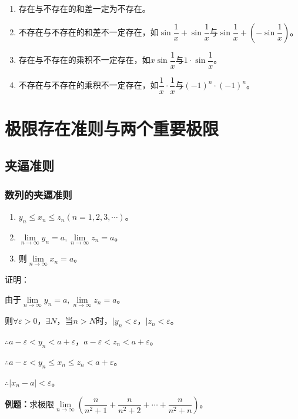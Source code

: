 \documentclass[UTF8, 12pt]{ctexart}
\begin{document}
    \begin{enumerate}
        \item 存在与不存在的和差一定为不存在。
        \item 不存在与不存在的和差不一定存在，如$\sin\dfrac{1}{x}+\sin\dfrac{1}{x}$与$\sin\dfrac{1}{x}+\left(-\sin\dfrac{1}{x}\right)$。
        \item 存在与不存在的乘积不一定存在，如$x\sin\dfrac{1}{x}$与$1\cdot\sin\dfrac{1}{x}$。
        \item 不存在与不存在的乘积不一定存在，如$\dfrac{1}{x}\cdot\dfrac{1}{x}$与$(-1)^n\cdot(-1)^n$。
    \end{enumerate}


    \section{极限存在准则与两个重要极限}

    \subsection{夹逼准则}

    \subsubsection{数列的夹逼准则}

    \begin{enumerate}
        \item $y_n\leqslant x_n\leqslant z_n(n=1,2,3,\cdots)$。
        \item $\lim\limits_{n\to\infty}y_n=a,\lim\limits_{n\to\infty}z_n=a$。
        \item 则$\lim\limits_{n\to\infty}x_n=a$。
    \end{enumerate}

    证明：

    由于$\lim\limits_{n\to\infty}y_n=a,\lim\limits_{n\to\infty}z_n=a$。

    则$\forall\varepsilon>0$，$\exists N$，当$n>N$时，$\vert y_n<\varepsilon$，$\vert z_n<\varepsilon$。

    $\therefore a-\varepsilon<y_n<a+\varepsilon$，$a-\varepsilon<z_n<a+\varepsilon$。

    $\therefore a-\varepsilon<y_n\leqslant x_n\leqslant z_n<a+\varepsilon$。

    $\therefore\vert x_n-a\vert<\varepsilon$。

    \textbf{例题：}求极限$\lim\limits_{n\to\infty}\left(\dfrac{n}{n^2+1}+\dfrac{n}{n^2+2}+\cdots+\dfrac{n}{n^2+n}\right)$。
\end{document}
